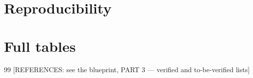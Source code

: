 \documentclass[11pt]{article}
\theoremstyle{definition}
\theoremstyle{remark}
\theoremstyle{plain}
\begin{document}
\section{Reproducibility}\label{app:repro}
\section{Full tables}\label{app:tables}

\begin{thebibliography}{99}
 [REFERENCES: see the blueprint, PART 3 --- verified and to-be-verified lists]
\end{thebibliography}
\end{document}
